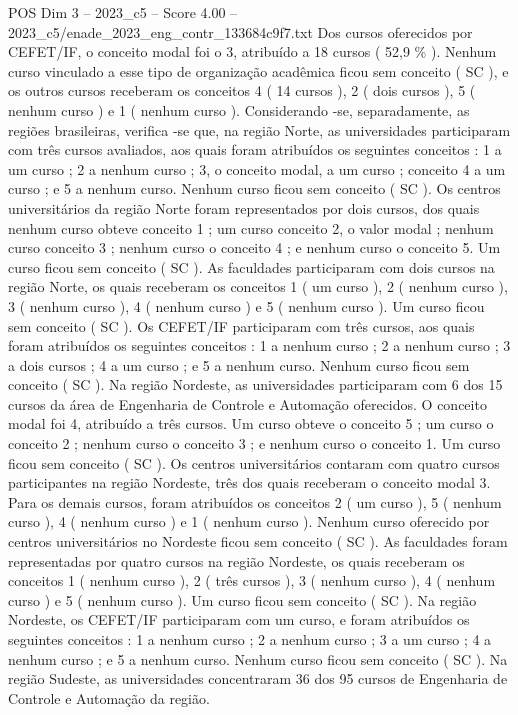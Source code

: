 \begin{textsample}{POS Dim 3 – 2023\_c5 – Score 4.00 – 2023\_c5/enade\_2023\_eng\_contr\_133684c9f7.txt}
Dos cursos oferecidos por CEFET/IF, o conceito modal foi o 3, atribuído a 18 cursos ( 52,9 \% ).
Nenhum curso vinculado a esse tipo de organização acadêmica ficou sem conceito ( SC ), e os outros cursos receberam os conceitos 4 ( 14 cursos ), 2 ( dois cursos ), 5 ( nenhum curso ) e 1 ( nenhum curso ).
Considerando -se, separadamente, as regiões brasileiras, verifica -se que, na região Norte, as universidades participaram com três cursos avaliados, aos quais foram atribuídos os seguintes conceitos : 1 a um curso ; 2 a nenhum curso ; 3, o conceito modal, a um curso ; conceito 4 a um curso ; e 5 a nenhum curso.
Nenhum curso ficou sem conceito ( SC ).
Os centros universitários da região Norte foram representados por dois cursos, dos quais nenhum curso obteve conceito 1 ; um curso conceito 2, o valor modal ; nenhum curso conceito 3 ; nenhum curso o conceito 4 ; e nenhum curso o conceito 5.
Um curso ficou sem conceito ( SC ).
As faculdades participaram com dois cursos na região Norte, os quais receberam os conceitos 1 ( um curso ), 2 ( nenhum curso ), 3 ( nenhum curso ), 4 ( nenhum curso ) e 5 ( nenhum curso ).
Um curso ficou sem conceito ( SC ).
Os CEFET/IF participaram com três cursos, aos quais foram atribuídos os seguintes conceitos : 1 a nenhum curso ; 2 a nenhum curso ; 3 a dois cursos ; 4 a um curso ; e 5 a nenhum curso.
Nenhum curso ficou sem conceito ( SC ).
Na região Nordeste, as universidades participaram com 6 dos 15 cursos da área de Engenharia de Controle e Automação oferecidos.
O conceito modal foi 4, atribuído a três cursos.
Um curso obteve o conceito 5 ; um curso o conceito 2 ; nenhum curso o conceito 3 ; e nenhum curso o conceito 1.
Um curso ficou sem conceito ( SC ).
Os centros universitários contaram com quatro cursos participantes na região Nordeste, três dos quais receberam o conceito modal 3.
Para os demais cursos, foram atribuídos os conceitos 2 ( um curso ), 5 ( nenhum curso ), 4 ( nenhum curso ) e 1 ( nenhum curso ).
Nenhum curso oferecido por centros universitários no Nordeste ficou sem conceito ( SC ).
As faculdades foram representadas por quatro cursos na região Nordeste, os quais receberam os conceitos 1 ( nenhum curso ), 2 ( três cursos ), 3 ( nenhum curso ), 4 ( nenhum curso ) e 5 ( nenhum curso ).
Um curso ficou sem conceito ( SC ).
Na região Nordeste, os CEFET/IF participaram com um curso, e foram atribuídos os seguintes conceitos : 1 a nenhum curso ; 2 a nenhum curso ; 3 a um curso ; 4 a nenhum curso ; e 5 a nenhum curso.
Nenhum curso ficou sem conceito ( SC ).
Na região Sudeste, as universidades concentraram 36 dos 95 cursos de Engenharia de Controle e Automação da região.

\end{textsample}
